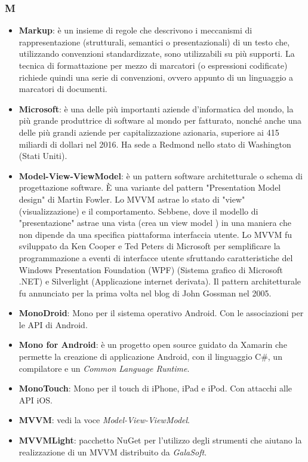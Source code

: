 \subsubsection{M}
\begin{itemize}
	\item \textbf{Markup}: è un insieme di regole che descrivono i meccanismi di rappresentazione (strutturali, semantici o presentazionali) di un testo che, utilizzando convenzioni standardizzate, sono utilizzabili su più supporti. La tecnica di formattazione per mezzo di marcatori (o espressioni codificate) richiede quindi una serie di convenzioni, ovvero appunto di un linguaggio a marcatori di documenti.
	\item \textbf{Microsoft}: è una delle più importanti aziende d'informatica del mondo, la più grande produttrice di software al mondo per fatturato, nonché anche una delle più grandi aziende per capitalizzazione azionaria, superiore ai 415 miliardi di dollari nel 2016. Ha sede a Redmond nello stato di Washington (Stati Uniti).
	\item \textbf{Model-View-ViewModel}:  è un pattern software architetturale o schema di progettazione software. È una variante del pattern "Presentation Model design" di Martin Fowler. Lo MVVM astrae lo stato di "view" (visualizzazione) e il comportamento. Sebbene, dove il modello di "presentazione" astrae una vista (crea un view model ) in una maniera che non dipende da una specifica piattaforma interfaccia utente. Lo MVVM fu sviluppato da Ken Cooper e Ted Peters di Microsoft per semplificare la programmazione a eventi di interfacce utente sfruttando caratteristiche del Windows Presentation Foundation (WPF) (Sistema grafico di Microsoft .NET) e Silverlight (Applicazione internet derivata). Il pattern architetturale fu annunciato per la prima volta nel blog di John Gossman nel 2005.
	\item \textbf{MonoDroid}:  Mono per il sistema operativo Android. Con le associazioni per le API di Android.
	\item \textbf{Mono for Android}: è un progetto open source guidato da Xamarin che permette la creazione di applicazione Android, con il linguaggio C\#, un compilatore e un \textit{Common Language Runtime}. 
	\item \textbf{MonoTouch}: Mono per il touch di iPhone, iPad e iPod. Con attacchi alle API iOS.
	\item \textbf{MVVM}: vedi la voce \textit{Model-View-ViewModel}.
	\item \textbf{MVVMLight}: pacchetto NuGet per l'utilizzo degli strumenti che aiutano la realizzazione di un MVVM distribuito da \textit{GalaSoft}.
\end{itemize}

